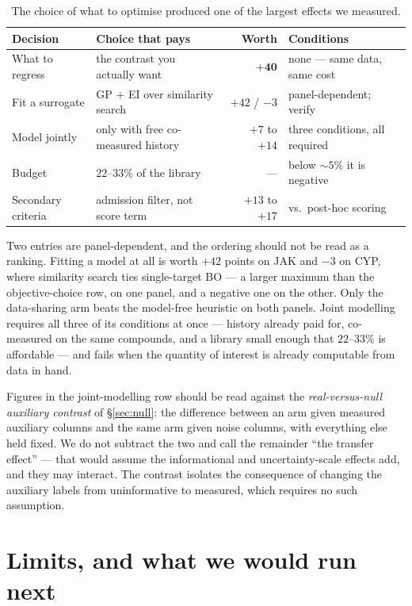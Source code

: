 \documentclass[11pt]{article}
\begin{document}
\begin{table}[ht]
\centering\small
\begin{tabular}{llrl}
\toprule
Decision & Choice that pays & Worth & Conditions \\
\midrule
What to regress & the contrast you actually want & $\mathbf{+40}$ &
  none --- same data, same cost \\
Fit a surrogate & GP + EI over similarity search & $+42$ / $-3$ &
  panel-dependent; verify \\
Model jointly & only with free co-measured history & $+7$ to $+14$ &
  three conditions, all required \\
Budget & $22$--$33\%$ of the library & --- &
  below ${\sim}5\%$ it is negative \\
Secondary criteria & admission filter, not score term & $+13$ to $+17$ &
  vs.\ post-hoc scoring \\
\bottomrule
\end{tabular}
\caption{The choice of what to optimise produced one of the largest effects we measured.}
\label{tab:worth}
\end{table}

Two entries are panel-dependent, and the ordering should not be read as a
ranking. Fitting a model at all is worth $+42$ points on JAK and $-3$ on CYP,
where similarity search ties single-target BO --- a larger maximum than the
objective-choice row, on one panel, and a negative one on the other. Only the
data-sharing arm beats the model-free heuristic on both panels. Joint modelling
requires all three of its conditions at once --- history already paid for,
co-measured on the same compounds, and a library small enough that $22$--$33\%$
is affordable --- and fails when the quantity of interest is already computable
from data in hand.

Figures in the joint-modelling row should be read against the
\emph{real-versus-null auxiliary contrast} of \S\ref{sec:null}: the difference
between an arm given measured auxiliary columns and the same arm given noise
columns, with everything else held fixed. We do not subtract the two and call
the remainder ``the transfer effect'' --- that would assume the informational
and uncertainty-scale effects add, and they may interact. The contrast isolates
the consequence of changing the auxiliary labels from uninformative to measured,
which requires no such assumption.

\section{Limits, and what we would run next}
\label{sec:limitations}
\end{document}
